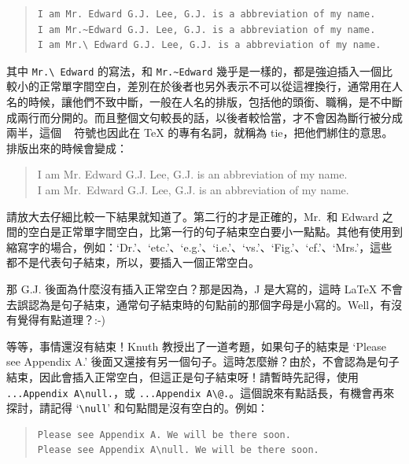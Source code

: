 \begin{enumerate}
         \begin{quote}
            \begin{verbatim}
I am Mr. Edward G.J. Lee, G.J. is a abbreviation of my name.
I am Mr.~Edward G.J. Lee, G.J. is a abbreviation of my name.
I am Mr.\ Edward G.J. Lee, G.J. is a abbreviation of my name.
\end{verbatim}
         \end{quote}

         其中 \verb|Mr.\ Edward| 的寫法，和 \verb|Mr.~Edward| 幾乎是一樣的，都是強迫插入一個比較小的正常單字間空白，差別在於後者也另外表示不可以從這裡換行，通常用在人名的時候，讓他們不致中斷，一般在人名的排版，包括他的頭銜、職稱，是不中斷成兩行而分開的。而且整個文句較長的話，以後者較恰當，才不會因為斷行被分成兩半，這個 {\ttfamily ~} 符號也因此在 \TeX{} 的專有名詞，就稱為 tie，把他們綁住的意思。排版出來的時候會變成：

         \begin{quote}
            I am Mr. Edward G.J. Lee, G.J. is an abbreviation of my name.\\
            I am Mr.\ Edward G.J. Lee, G.J. is an abbreviation of my name.
         \end{quote}

         請放大去仔細比較一下結果就知道了。第二行的才是正確的，Mr.\ 和 Edward 之間的空白是正常單字間空白，比第一行的句子結束空白要小一點點。其他有使用到縮寫字的場合，例如：`Dr.'、`etc.'、`e.g.'、`i.e.'、`vs.'、`Fig.'、`cf.'、`Mrs.'，這些都不是代表句子結束，所以，要插入一個正常空白。

         那 G.J. 後面為什麼沒有插入正常空白？那是因為，J 是大寫的，這時 \LaTeX{} 不會去誤認為是句子結束，通常句子結束時的句點前的那個字母是小寫的。Well，有沒有覺得有點道理？:-)

         等等，事情還沒有結束！Knuth 教授出了一道考題，如果句子的結束是 `Please see Appendix A.' 後面又還接有另一個句子。這時怎麼辦？由於，不會認為是句子結束，因此會插入正常空白，但這正是句子結束呀！請暫時先記得，使用 \verb|...Appendix A\null.|，或 \verb|...Appendix A\@.|。這個說來有點話長，有機會再來探討，請記得 `\verb|\null|' 和句點間是沒有空白的。例如：

         \begin{quote}
            \begin{verbatim}
Please see Appendix A. We will be there soon.
Please see Appendix A\null. We will be there soon.
\end{verbatim}
         \end{quote}


\end{enumerate}
